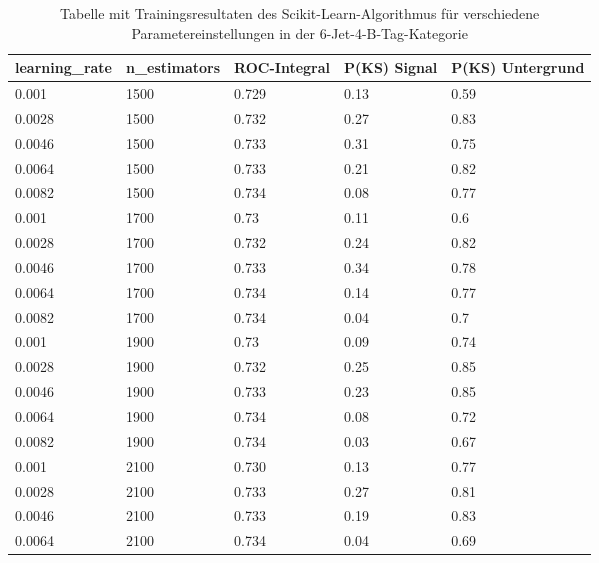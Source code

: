 \begin{table}[hhh]\parbox{12cm}{
\renewcommand\thetable{A.1}
  \caption[Scikit-Learn 6j4t Ergebnisse]{Tabelle mit Trainingsresultaten des Scikit-Learn-Algorithmus f\"ur verschiedene Parametereinstellungen in der 6-Jet-4-B-Tag-Kategorie}%
  }\label{tab:sklearn_6j4t}
  \begin{center}
  \begin{tabular}{lllll}
  \hline
  learning\_rate & n\_estimators & ROC-Integral & P(KS) Signal & P(KS) Untergrund\\
  \hline
\num{0,001}  & \num{1500} & \num{0,729} & \num{0,13} & \num{0,59}\\
\num{0,0028} & \num{1500} & \num{0,732} & \num{0,27} & \num{0,83}\\
\num{0,0046} & \num{1500} & \num{0,733} & \num{0,31} & \num{0,75}\\
\num{0,0064} & \num{1500} & \num{0,733} & \num{0,21} & \num{0,82}\\
\num{0,0082} & \num{1500} & \num{0,734} & \num{0,08} & \num{0,77}\\
\num{0,001}  & \num{1700} & \num{0,73}  & \num{0,11} & \num{0,6}\\
\num{0,0028} & \num{1700} & \num{0,732} & \num{0,24} & \num{0,82}\\
\num{0,0046} & \num{1700} & \num{0,733} & \num{0,34} & \num{0,78}\\
\num{0,0064} & \num{1700} & \num{0,734} & \num{0,14} & \num{0,77}\\
\num{0,0082} & \num{1700} & \num{0,734} & \num{0,04} & \num{0,7}\\
\num{0,001}  & \num{1900} & \num{0,73}  & \num{0,09} & \num{0,74}\\
\num{0,0028} & \num{1900} & \num{0,732} & \num{0,25} & \num{0,85}\\
\num{0,0046} & \num{1900} & \num{0,733} & \num{0,23} & \num{0,85}\\
\num{0,0064} & \num{1900} & \num{0,734} & \num{0,08} & \num{0,72}\\
\num{0,0082} & \num{1900} & \num{0,734} & \num{0,03} & \num{0,67}\\
\num{0,001}  & \num{2100} & \num{0,730} & \num{0,13} & \num{0,77}\\
\num{0,0028} & \num{2100} & \num{0,733} & \num{0,27} & \num{0,81}\\
\num{0,0046} & \num{2100} & \num{0,733} & \num{0,19} & \num{0,83}\\
\num{0,0064} & \num{2100} & \num{0,734} & \num{0,04} & \num{0,69}\\

\end{tabular}
\end{center}
\end{table}
